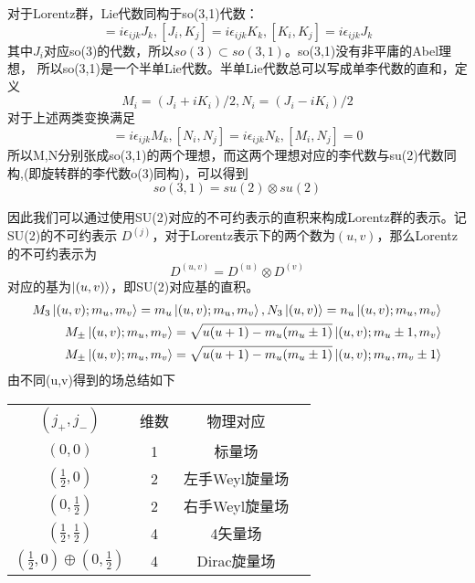 \documentclass[10pt]{ctexart}
\begin{document}
对于Lorentz群，Lie代数同构于so(3,1)代数：
\begin{equation}
    [J_i,J_j]=i\epsilon_{ijk}J_k,[J_i,K_j]=i\epsilon_{ijk}K_k,[K_i,K_j]=i\epsilon_{ijk}J_k
\end{equation}
其中$J_i$对应so(3)的代数，所以$so(3)\subset so(3,1)$\cite{yucheng}。so(3,1)没有非平庸的Abel理想，
所以so(3,1)是一个半单Lie代数。半单Lie代数总可以写成单李代数的直和，定义
\begin{equation}
    M_i=(J_i+iK_i)/2, N_i=(J_i-iK_i)/2
\end{equation}
对于上述两类变换满足
\begin{equation}
    [M_i,M_j]=i\epsilon_{ijk}M_k,[N_i,N_j]=i\epsilon_{ijk}N_k,[M_i,N_j]=0
\end{equation}
所以M,N分别张成so(3,1)的两个理想，而这两个理想对应的李代数与su(2)代数同构,(即旋转群的李代数o(3)同构)，可以得到
\begin{equation}
    so(3,1)=su(2)\otimes su(2)
\end{equation}

因此我们可以通过使用SU(2)对应的不可约表示的直积来构成Lorentz群的表示。记SU(2)的不可约表示
$D^{(j)}$，对于Lorentz表示下的两个数为$(u,v)$，那么Lorentz的不可约表示为
\begin{equation}
    D^{(u,v)}=D^{(u)}\otimes D^{(v)}
\end{equation}
对应的基为$\ket{(u,v)}$，即SU(2)对应基的直积。
\begin{align}
    M_3 \ket{(u,v);m_u,m_v}=m_u\ket{(u,v);m_u,m_v}, N_3 \ket{(u,v)} =n_u \ket{(u,v);m_u,m_v}\\
    M_\pm \ket{(u,v);m_u,m_v} = \sqrt{u(u+1)-m_u(m_u\pm1)}\ket{(u,v);m_u\pm1,m_v}\\
    M_\pm \ket{(u,v);m_u,m_v} = \sqrt{u(u+1)-m_u(m_u\pm1)}\ket{(u,v);m_u,m_v\pm1}
\end{align}
由不同(u,v)得到的场总结如下\cite{Mceey}
\begin{table}
    \centering
    \begin{tabular}{|c|c|c|c|}
        $(j_+,j_-)$&维数&物理对应\\
        $(0,0)$&1&标量场\\
        $(\frac{1}{2},0)$&2&左手Weyl旋量场\\
        $(0,\frac{1}{2})$&2&右手Weyl旋量场\\
        $(\frac{1}{2},\frac{1}{2})$&4&4矢量场\\
        $(\frac{1}{2},0)\oplus (0,\frac{1}{2})$&4&Dirac旋量场\\
    \end{tabular}
\end{table}
\end{document}
